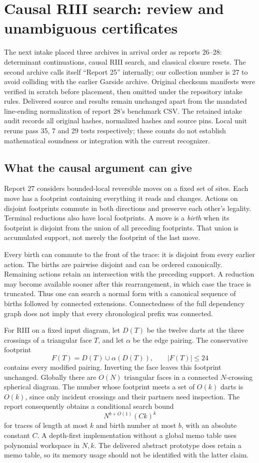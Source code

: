 \section{Causal RIII search: review and unambiguous certificates}
\label{sec:causal-r3}

The next intake placed three archives in arrival order as reports 26--28:
determinant continuations, causal RIII search, and classical closure resets.
The second archive calls itself ``Report 25'' internally; our collection
number is 27 to avoid colliding with the earlier Garside archive.
Original checksum manifests were verified in scratch before placement,
then omitted under the repository intake rules.  Delivered source and
results remain unchanged apart from the mandated line-ending normalization
of report 28's benchmark CSV.  The retained intake audit records all
original hashes, normalized hashes and source pins.  Local unit reruns pass
35, 7 and 29 tests respectively; these counts do not establish mathematical
soundness or integration with the current recognizer.

\subsection{What the causal argument can give}
Report 27 considers bounded-local reversible moves on a fixed set of sites.
Each move has a footprint containing everything it reads and changes.
Actions on disjoint footprints commute in both directions and preserve
each other's legality.  Terminal reductions also have local footprints.
A move is a \emph{birth} when its footprint is disjoint from the union of
all preceding footprints.  That union is accumulated support, not merely
the footprint of the last move.

Every birth can commute to the front of the trace: it is disjoint from
every earlier action.  The births are pairwise disjoint and can be ordered
canonically.  Remaining actions retain an intersection with the preceding
support.  A reduction may become available sooner after this rearrangement,
in which case the trace is truncated.  Thus one can search a normal form
with a canonical sequence of births followed by connected extensions.
Connectedness of the full dependency graph does not imply that every
chronological prefix was connected.

For RIII on a fixed input diagram, let $D(T)$ be the twelve darts at the
three crossings of a triangular face $T$, and let $\alpha$ be the edge
pairing.  The conservative footprint
\[
 F(T)=D(T)\cup\alpha(D(T)),\qquad |F(T)|\le24
\]
contains every modified pairing.  Inverting the face leaves this footprint
unchanged.  Globally there are $O(N)$ triangular faces in a connected
$N$-crossing spherical diagram.  The number whose footprint meets a set
of $O(k)$ darts is $O(k)$, since only incident crossings and their partners
need inspection.  The report consequently obtains a conditional search
bound
\[
 N^{b+O(1)}(Ck)^k
\]
for traces of length at most $k$ and birth number at most $b$, with an
absolute constant $C$.  A depth-first implementation without a global
memo table uses polynomial workspace in $N,k$.  The delivered abstract
prototype does retain a memo table, so its memory usage should not be
identified with the latter claim.

